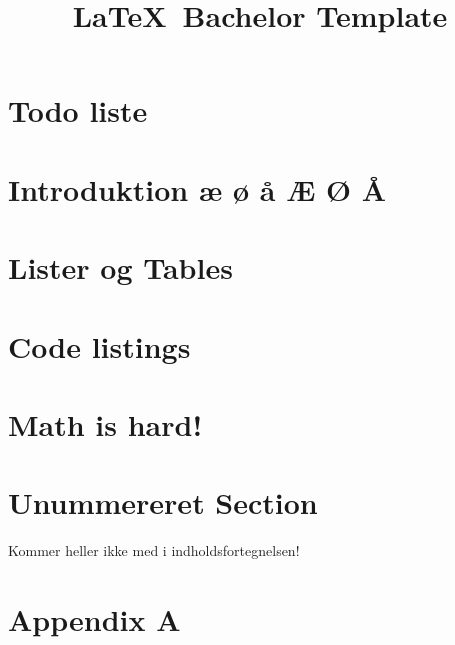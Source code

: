 \documentclass[12pt,oneside,a4paper,danish]{article}
\title{\LaTeX\ Bachelor Template}
\begin{document}


\newpage
\section{Todo liste} \label{todo}


\newpage
\tableofcontents
\thispagestyle{fancy} 

\newpage
{} 

\newpage
\section{Introduktion æ ø å Æ Ø Å} \label{ch1}
 

\newpage
\section{Lister og Tables} \label{ch2}


\newpage
\section{Code listings} \label{ch3}


\newpage
\section{Math is hard!} \label{ch4}


\newpage
\section*{Unummereret Section}
Kommer heller ikke med i indholdsfortegnelsen! 

%  

\label{EndOfText}

\newpage
{} 

\newpage
\listoffigures
\thispagestyle{fancy}

\newpage
{}
\listoftables
\thispagestyle{fancy}

\newpage
{}
 


\newpage
\section{Appendix A} \label{ch6}

\label{endOfDoc}
\end{document}

